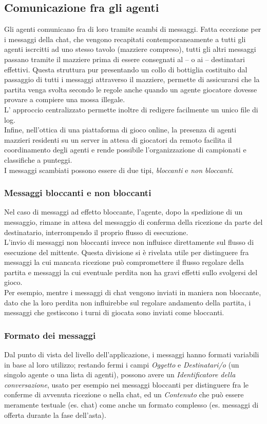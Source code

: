 \subsection{Comunicazione fra gli agenti}

Gli agenti comunicano fra di loro tramite scambi di messaggi.
Fatta eccezione per i messaggi della chat, che vengono recapitati contemporaneamente a tutti gli agenti iscrcitti ad uno stesso tavolo (mazziere compreso), tutti gli altri messaggi passano tramite il mazziere prima di essere consegnati al -- o ai -- destinatari effettivi.
Questa struttura pur presentando un collo di bottiglia costituito dal passaggio di tutti i messaggi attraverso il mazziere, permette di assicurarsi che la partita venga svolta secondo le regole anche quando un agente giocatore dovesse provare a compiere una mossa illegale.\\
L' approccio centralizzato permette inoltre di redigere facilmente un unico file di log.\\
Infine, nell'ottica di una piattaforma di gioco online, la presenza di agenti mazzieri residenti su un server in attesa di giocatori da remoto facilita il coordinamento degli agenti e rende possibile l'organizzazione di campionati e classifiche a punteggi.\\
I messaggi scambiati possono essere di due tipi, \emph{bloccanti} e \emph{non bloccanti}.\\

\subsubsection*{Messaggi bloccanti e non bloccanti}

Nel caso di messaggi ad effetto bloccante, l'agente, dopo la spedizione di un messaggio, rimane in attesa del messaggio di conferma della ricezione da parte del destinatario, interrompendo il proprio flusso di esecuzione.\\
L'invio di messaggi non bloccanti invece non influisce direttamente sul flusso di esecuzione del mittente.
Questa divisione si è rivelata utile per distinguere fra messaggi la cui mancata ricezione può compromettere il flusso regolare della partita e messaggi la cui eventuale perdita non ha gravi effetti sullo svolgersi del gioco.\\
Per esempio, mentre i messaggi di chat vengono inviati in maniera non bloccante, dato che la loro perdita non influirebbe sul regolare andamento della partita, i messaggi che gestiscono i turni di giocata sono inviati come bloccanti.


\subsubsection*{Formato dei messaggi}
Dal punto di vista del livello dell'applicazione, i messaggi hanno formati variabili in base al loro utilizzo; restando fermi i campi \emph{Oggetto} e \emph{Destinatari/o} (un singolo agente o una lista di agenti), possono avere un \emph{Identificatore della conversazione}, usato per esempio nei messaggi bloccanti per distinguere fra le conferme di avvenuta ricezione o nella chat, ed un \emph{Contenuto} che può essere meramente testuale (es. chat) come anche un formato complesso (es. messaggi di offerta durante la fase dell'asta).
